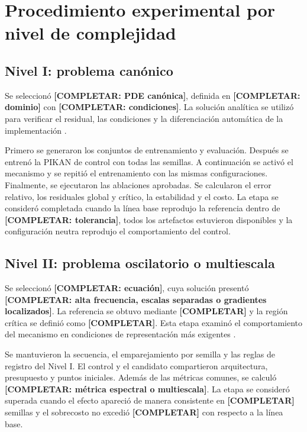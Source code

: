 \section{Procedimiento experimental por nivel de complejidad}
\label{subsec:procedimiento-dominios}

\subsection{Nivel I: problema canónico}

Se seleccionó \textbf{[COMPLETAR: PDE canónica]}, definida en \textbf{[COMPLETAR: dominio]} con \textbf{[COMPLETAR: condiciones]}. La solución analítica se utilizó para verificar el residual, las condiciones y la diferenciación automática de la implementación \cite{lagaris1998,raissi2019,grossmann2024}.

Primero se generaron los conjuntos de entrenamiento y evaluación. Después se entrenó la PIKAN de control con todas las semillas. A continuación se activó el mecanismo y se repitió el entrenamiento con las mismas configuraciones. Finalmente, se ejecutaron las ablaciones aprobadas. Se calcularon el error relativo, los residuales global y crítico, la estabilidad y el costo. La etapa se consideró completada cuando la línea base reprodujo la referencia dentro de \textbf{[COMPLETAR: tolerancia]}, todos los artefactos estuvieron disponibles y la configuración neutra reprodujo el comportamiento del control.

\subsection{Nivel II: problema oscilatorio o multiescala}

Se seleccionó \textbf{[COMPLETAR: ecuación]}, cuya solución presentó \textbf{[COMPLETAR: alta frecuencia, escalas separadas o gradientes localizados]}. La referencia se obtuvo mediante \textbf{[COMPLETAR]} y la región crítica se definió como \textbf{[COMPLETAR]}. Esta etapa examinó el comportamiento del mecanismo en condiciones de representación más exigentes \cite{rahaman2019,tancik2020,wang2021eigenvector}.

Se mantuvieron la secuencia, el emparejamiento por semilla y las reglas de registro del Nivel I. El control y el candidato compartieron arquitectura, presupuesto y puntos iniciales. Además de las métricas comunes, se calculó \textbf{[COMPLETAR: métrica espectral o multiescala]}. La etapa se consideró superada cuando el efecto apareció de manera consistente en \textbf{[COMPLETAR]} semillas y el sobrecosto no excedió \textbf{[COMPLETAR]} con respecto a la línea base.

